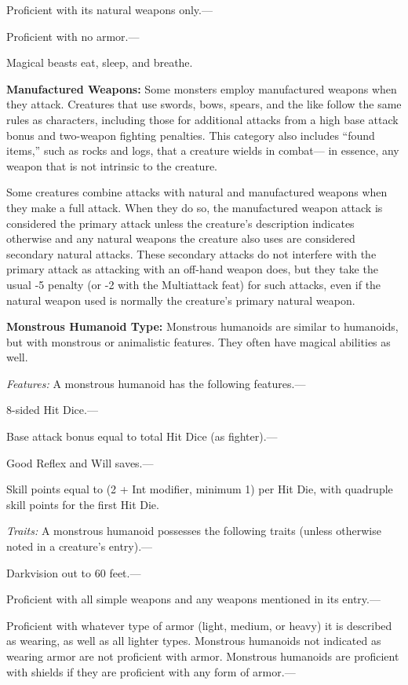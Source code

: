 \documentclass{article}
\begin{document}
Proficient with its natural weapons only.---

Proficient with no armor.---

Magical beasts eat, sleep, and breathe.

\vspace{12pt}
\textbf{Manufactured Weapons:} Some monsters employ manufactured weapons when they 
attack. Creatures that use swords, bows, spears, and the like follow the same rules 
as characters, including those for additional attacks from a high base attack bonus 
and two-weapon fighting penalties. This category also includes ``found items,'' 
such as rocks and logs, that a creature wields in combat--- in essence, any weapon 
that is not intrinsic to the creature.

Some creatures combine attacks with natural and manufactured weapons when they 
make a full attack. When they do so, the manufactured weapon attack is considered 
the primary attack unless the creature's description indicates otherwise and any 
natural weapons the creature also uses are considered secondary natural attacks. 
These secondary attacks do not interfere with the primary attack as attacking with 
an off-hand weapon does, but they take the usual -5 penalty (or -2 with the Multiattack 
feat) for such attacks, even if the natural weapon used is normally the creature's 
primary natural weapon.

\vspace{12pt}
\textbf{Monstrous Humanoid Type: }Monstrous humanoids are similar to humanoids, 
but with monstrous or animalistic features. They often have magical abilities as 
well.

\textit{Features: }A monstrous humanoid has the following features.---

8-sided Hit Dice.---

Base attack bonus equal to total Hit Dice (as fighter).---

Good Reflex and Will saves.---

Skill points equal to (2 + Int modifier, minimum 1) per Hit Die, with quadruple 
skill points for the first Hit Die.

\textit{Traits: }A monstrous humanoid possesses the following traits (unless otherwise 
noted in a creature's entry).---

Darkvision out to 60 feet.---

Proficient with all simple weapons and any weapons mentioned in its entry.---

Proficient with whatever type of armor (light, medium, or heavy) it is described 
as wearing, as well as all lighter types. Monstrous humanoids not indicated as 
wearing armor are not proficient with armor. Monstrous humanoids are proficient 
with shields if they are proficient with any form of armor.---
\end{document}
